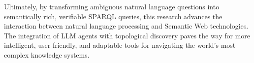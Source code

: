 Ultimately, by transforming ambiguous natural language questions into semantically rich, verifiable SPARQL queries, this research advances the interaction between natural language processing and Semantic Web technologies. The integration of LLM agents with topological discovery paves the way for more intelligent, user-friendly, and adaptable tools for navigating the world's most complex knowledge systems.
